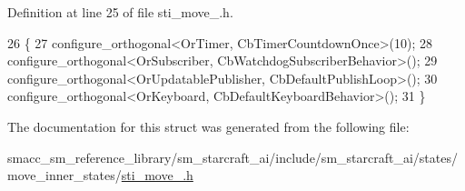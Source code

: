 Definition at line 25 of file sti\+\_\+move\+\_.\+h.


\begin{DoxyCode}
26   \{
27     configure\_orthogonal<OrTimer, CbTimerCountdownOnce>(10);
28     configure\_orthogonal<OrSubscriber, CbWatchdogSubscriberBehavior>();
29     configure\_orthogonal<OrUpdatablePublisher, CbDefaultPublishLoop>();
30     configure\_orthogonal<OrKeyboard, CbDefaultKeyboardBehavior>();
31   \}
\end{DoxyCode}


The documentation for this struct was generated from the following file\+:\begin{DoxyCompactItemize}
\item 
smacc\+\_\+sm\+\_\+reference\+\_\+library/sm\+\_\+starcraft\+\_\+ai/include/sm\+\_\+starcraft\+\_\+ai/states/move\+\_\+inner\+\_\+states/\hyperlink{sti__move__3_8h}{sti\+\_\+move\+\_.\+h}\end{DoxyCompactItemize}

